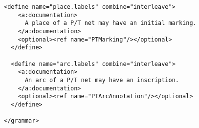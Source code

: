 \begin{lstlisting}[label=grammar_place_transitions,caption=RELAX NG implementation of PNTD for Place/Transition nets]
  <define name="place.labels" combine="interleave">
    <a:documentation>
      A place of a P/T net may have an initial marking.
    </a:documentation> 
    <optional><ref name="PTMarking"/></optional>
  </define>

  <define name="arc.labels" combine="interleave">
    <a:documentation>
      An arc of a P/T net may have an inscription.
    </a:documentation>
    <optional><ref name="PTArcAnnotation"/></optional>
  </define>

</grammar>
\end{lstlisting}
